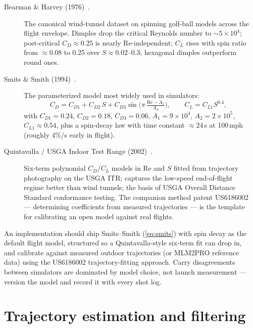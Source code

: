 \begin{description}
\item[Bearman \& Harvey (1976)~\cite{bearmanharvey}.] The canonical
wind-tunnel dataset on spinning golf-ball models across the flight
envelope. Dimples drop the critical Reynolds number to
$\sim5\times10^4$; post-critical $C_D \approx 0.25$ is nearly
Re-independent; $C_L$ rises with spin ratio from $\approx$0.08 to 0.25
over $S \approx 0.02$--0.3; hexagonal dimples outperform round ones.
\item[Smits \& Smith (1994)~\cite{smitssmith}.] The parameterized model
most widely used in simulators:
\begin{equation}
\label{eq:smits}
C_D = C_{D1} + C_{D2}\,S + C_{D3}\sin\!\bigl(\pi\,
  \tfrac{\mathrm{Re}-A_1}{A_2}\bigr),
\qquad
C_L = C_{L1} S^{0.4},
\end{equation}
with $C_{D1}=0.24$, $C_{D2}=0.18$, $C_{D3}=0.06$, $A_1=9\times10^4$,
$A_2=2\times10^5$, $C_{L1}\approx0.54$, plus a spin-decay law with time
constant $\approx24$\,s at 100\,mph (roughly 4\%/s early in flight).
\item[Quintavalla / USGA Indoor Test Range (2002)~\cite{quintavalla}.]
Six-term polynomial $C_D$/$C_L$ models in Re and $S$ fitted from
trajectory photography on the USGA ITR; captures the low-speed
end-of-flight regime better than wind tunnels; the basis of USGA Overall
Distance Standard conformance testing. The companion method patent
US6186002~\cite{us6186002} --- determining coefficients from measured
trajectories --- is the template for calibrating an open model against
real flights.
\end{description}

\begin{implication}
An implementation should ship Smits--Smith (\cref{eq:smits}) with spin decay as
the default flight model, structured so a Quintavalla-style six-term fit
can drop in, and calibrate against measured outdoor trajectories (or
MLM2PRO reference data) using the US6186002 trajectory-fitting approach.
Carry disagreements between simulators are dominated by model choice, not
launch measurement --- version the model and record it with every shot log.
\end{implication}

\section{Trajectory estimation and filtering}
\label{sec:ekf}

